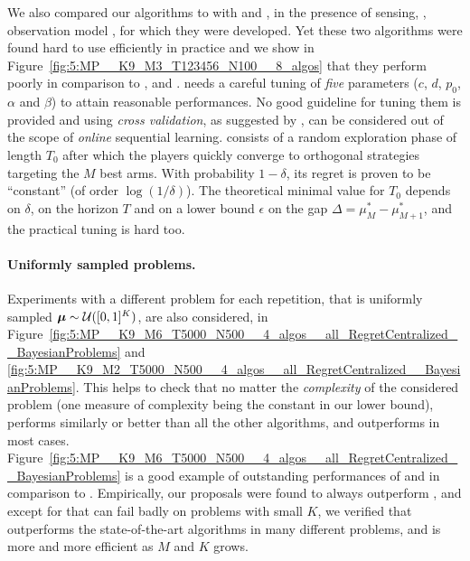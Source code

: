 We also compared our algorithms to  %
with \MEGA{} \citep{Avner15} and \MusicalChair{} \citep{Rosenski16}, in the presence of sensing, \ie, observation model \modeldeux, for which they were developed.
Yet these two algorithms were found hard to use efficiently in practice and we show in
%
Figure~\ref{fig:5:MP__K9_M3_T123456_N100__8_algos} that they perform poorly in comparison to \rhoRand, \RandTopM{} and \MCTopM.
%
\MEGA{} needs a careful tuning of \emph{five} parameters ($c$, $d$, $p_0$, $\alpha$ and $\beta$) to attain reasonable performances. No good guideline for tuning them is provided and using \emph{cross validation}, as suggested by \cite{Avner15},
can be considered out of the scope of \emph{online} sequential learning.
%
\MusicalChair{} consists of a random exploration phase of length $T_0$ after which the players quickly converge to orthogonal strategies targeting the $M$ best arms. With probability $1-\delta$, its regret is proven to be ``constant'' (of order $\log(1/\delta)$). The theoretical minimal value for $T_0$ depends on $\delta$, on the horizon $T$ and on a lower bound $\epsilon$ on the gap $\Delta = \mu^*_M - \mu^*_{M+1}$, and the practical tuning is hard too. %


\paragraph{Uniformly sampled problems.}
%
Experiments with a different problem for each repetition,
that is uniformly sampled $\boldsymbol{\mu} \sim \mathcal{U}([0,1]^K)$,
are also considered, in Figure~\ref{fig:5:MP__K9_M6_T5000_N500__4_algos__all_RegretCentralized__BayesianProblems} and \ref{fig:5:MP__K9_M2_T5000_N500__4_algos__all_RegretCentralized__BayesianProblems}.
This helps to check that no matter the \emph{complexity} of the considered problem (one measure of complexity being the constant in our lower bound),
\MCTopM{} performs similarly or better than all the other algorithms,
and \Selfish{} outperforms \rhoRand{} in most cases.
Figure~\ref{fig:5:MP__K9_M6_T5000_N500__4_algos__all_RegretCentralized__BayesianProblems} is a good example
of outstanding performances of \MCTopM{} and \Selfish{} in comparison to \rhoRand{}.
%
Empirically, our proposals were found to always outperform \rhoRand{}, and except for \Selfish{} that can fail badly on problems with small $K$,
we verified that \MCTopM{} outperforms the state-of-the-art algorithms in many different problems, and is more and more efficient as $M$ and $K$ grows.

